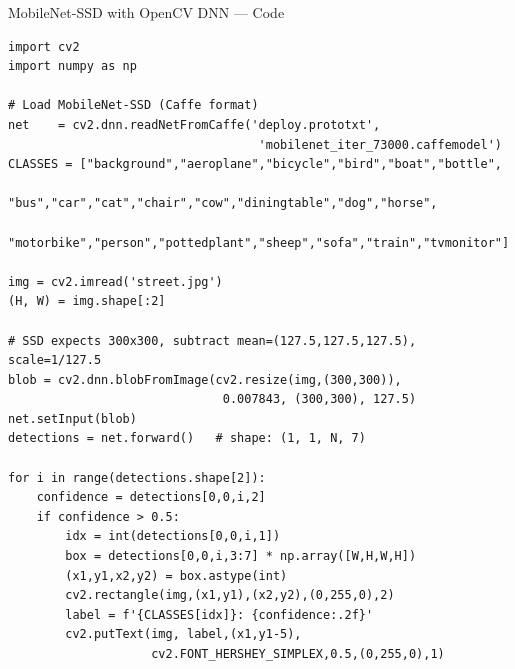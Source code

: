 \documentclass[aspectratio=169]{beamer}
\begin{document}
\begin{frame}[fragile]{MobileNet-SSD with OpenCV DNN — Code}
\begin{lstlisting}
import cv2
import numpy as np

# Load MobileNet-SSD (Caffe format)
net    = cv2.dnn.readNetFromCaffe('deploy.prototxt',
                                   'mobilenet_iter_73000.caffemodel')
CLASSES = ["background","aeroplane","bicycle","bird","boat","bottle",
           "bus","car","cat","chair","cow","diningtable","dog","horse",
           "motorbike","person","pottedplant","sheep","sofa","train","tvmonitor"]

img = cv2.imread('street.jpg')
(H, W) = img.shape[:2]

# SSD expects 300x300, subtract mean=(127.5,127.5,127.5), scale=1/127.5
blob = cv2.dnn.blobFromImage(cv2.resize(img,(300,300)),
                              0.007843, (300,300), 127.5)
net.setInput(blob)
detections = net.forward()   # shape: (1, 1, N, 7)

for i in range(detections.shape[2]):
    confidence = detections[0,0,i,2]
    if confidence > 0.5:
        idx = int(detections[0,0,i,1])
        box = detections[0,0,i,3:7] * np.array([W,H,W,H])
        (x1,y1,x2,y2) = box.astype(int)
        cv2.rectangle(img,(x1,y1),(x2,y2),(0,255,0),2)
        label = f'{CLASSES[idx]}: {confidence:.2f}'
        cv2.putText(img, label,(x1,y1-5),
                    cv2.FONT_HERSHEY_SIMPLEX,0.5,(0,255,0),1)
\end{lstlisting}
\end{frame}
\end{document}
